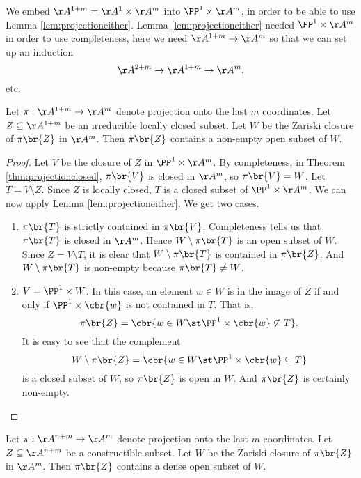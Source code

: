 We embed $ \AA^{1 + m} = \AA^1 \times \AA^m $ into $ \PP^1 \times \AA^m $, in order to be able to use Lemma \ref{lem:projectioneither}. Lemma \ref{lem:projectioneither} needed $ \PP^1 \times \AA^m $ in order to use completeness, here we need $ \AA^{1 + m} \to \AA^m $ so that we can set up an induction
$$ \AA^{2 + m} \to \AA^{1 + m} \to \AA^m, $$
etc.

\begin{lemma}
\label{lem:projectionopen}
Let $ \pi : \AA^{1 + m} \to \AA^m $ denote projection onto the last $ m $ coordinates. Let $ Z \subseteq \AA^{1 + m} $ be an irreducible locally closed subset. Let $ W $ be the Zariski closure of $ \pi\br{Z} $ in $ \AA^m $. Then $ \pi\br{Z} $ contains a non-empty open subset of $ W $.
\end{lemma}

\begin{proof}
Let $ V $ be the closure of $ Z $ in $ \PP^1 \times \AA^m $. By completeness, in Theorem \ref{thm:projectionclosed}, $ \pi\br{V} $ is closed in $ \AA^m $, so $ \pi\br{V} = W $. Let $ T = V \setminus Z $. Since $ Z $ is locally closed, $ T $ is a closed subset of $ \PP^1 \times \AA^m $. We can now apply Lemma \ref{lem:projectioneither}. We get two cases.
\begin{enumerate}[leftmargin=0.5in, label=Case \arabic*.]
\item $ \pi\br{T} $ is strictly contained in $ \pi\br{V} $. Completeness tells us that $ \pi\br{T} $ is closed in $ \AA^m $. Hence $ W \setminus \pi\br{T} $ is an open subset of $ W $. Since $ Z = V \setminus T $, it is clear that $ W \setminus \pi\br{T} $ is contained in $ \pi\br{Z} $. And $ W \setminus \pi\br{T} $ is non-empty because $ \pi\br{T} \ne W $.
\item $ V = \PP^1 \times W $. In this case, an element $ w \in W $ is in the image of $ Z $ if and only if $ \PP^1 \times \cbr{w} $ is not contained in $ T $. That is,
$$ \pi\br{Z} = \cbr{w \in W \st \PP^1 \times \cbr{w} \not\subseteq T}. $$
It is easy to see that the complement
$$ W \setminus \pi\br{Z} = \cbr{w \in W \st \PP^1 \times \cbr{w} \subseteq T} $$
is a closed subset of $ W $, so $ \pi\br{Z} $ is open in $ W $. And $ \pi\br{Z} $ is certainly non-empty.
\end{enumerate}
\end{proof}

\pagebreak

\begin{corollary}
\label{cor:projectionopen}
Let $ \pi : \AA^{n + m} \to \AA^m $ denote projection onto the last $ m $ coordinates. Let $ Z \subseteq \AA^{n + m} $ be a constructible subset. Let $ W $ be the Zariski closure of $ \pi\br{Z} $ in $ \AA^m $. Then $ \pi\br{Z} $ contains a dense open subset of $ W $.
\end{corollary}

